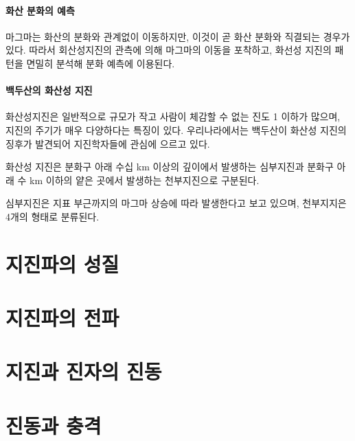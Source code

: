 \documentclass[12pt, a4paper, oneside]{book}
\begin{document}
	\paragraph{화산 분화의 예측}
	마그마는 화산의 분화와 관계없이 이동하지만, 이것이 곧 화산 분화와 직결되는 경우가 있다. 
	따라서 회산성지진의 관측에 의해 마그마의 이동을 포착하고, 화선성 지진의 패턴을 면밀히 분석해 분화 예측에 이용된다.
	

	\paragraph{백두산의 화산성 지진}
	화산성지진은 일반적으로 규모가 작고 사람이 체감할 수 없는 진도 1 이하가 많으며, 
	지진의 주기가 매우 다양하다는 특징이 있다. 
	우리나라에서는 백두산이 화산성 지진의 징후가 발견되어 지진학자들에 관심에 으르고 있다.
	
	화산성 지진은 분화구 아래 수십 km 이상의 깊이에서 발생하는 심부지진과 분화구 아래 수 km 이하의 얕은 곳에서 발생하는 천부지진으로 구분된다.
	
	심부지진은 지표 부근까지의 마그마 상승에 따라 발생한다고 보고 있으며, 천부지지은 4개의 형태로 분류된다.
	
	


	\clearpage
	\section{지진파의 성질}


	\clearpage
	\section{지진파의 전파}
	
	
	\clearpage
	\section{지진과 진자의 진동}
	
	
	
	\clearpage
	\section{진동과 충격}
	
	
	\clearpage
\end{document}
